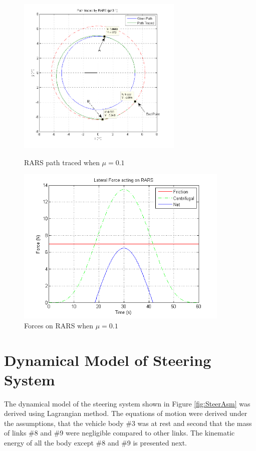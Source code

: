 {\begin{figure}
	\begin{minipage}[t]{0.5\textwidth}
		\centering
		\includegraphics[height=3in]{Chapter4/fig/PathWithMu-1slip}
		\caption{RARS path traced when $\mu=0.1$}\label{fig:pathWithMu1}
	\end{minipage}
	\hfill
	\begin{minipage}[t]{0.5\textwidth}
		\centering
		\includegraphics[height=3in,width=\textwidth]{Chapter4/fig/ForceMu-1}
		\caption{Forces on RARS when $\mu=0.1$ }\label{fig:ForcesMu1}
	\end{minipage}
\end{figure}
\section{Dynamical Model of Steering System}
The dynamical model of the steering system shown in Figure \ref{fig:SteerAsm} was derived  using Lagrangian method. The equations of motion were derived under the assumptions,  that the vehicle body \#3 was at rest and second that the mass of links \#8 and \#9 were negligible compared to other links. The kinematic energy of all the body except \#8 and \#9 is presented next.


}

